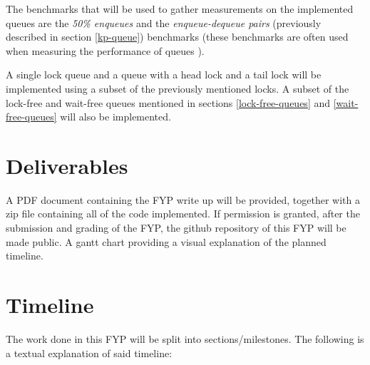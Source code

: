 \documentclass[a4paper, 12pt, titlepage]{article}
\begin{document}
\begin{singlespace}
The benchmarks that will be used to gather measurements on the implemented queues are the \emph{50\% enqueues} and the \emph{enqueue-dequeue pairs} (previously described in section \ref{kp-queue}) benchmarks (these benchmarks are often used when measuring the performance of queues \cite{kogan2011wait,hoffman2007baskets,ladan2004optimistic}).

A single lock queue and a queue with a head lock and a tail lock will be implemented using a subset of the previously mentioned locks. A subset of the lock-free and wait-free queues mentioned in sections \ref{lock-free-queues} and \ref{wait-free-queues} will also be implemented.

\section{Deliverables}
A PDF document containing the FYP write up will be provided, together with a zip file containing all of the code implemented. If permission is granted, after the submission and grading of the FYP, the github repository of this FYP will be made public. A gantt chart providing a visual explanation of the planned timeline.
\pagebreak
\section{Timeline}
The work done in this FYP will be split into sections/milestones. The following is a textual explanation of said timeline:


\end{singlespace}
\end{document}
